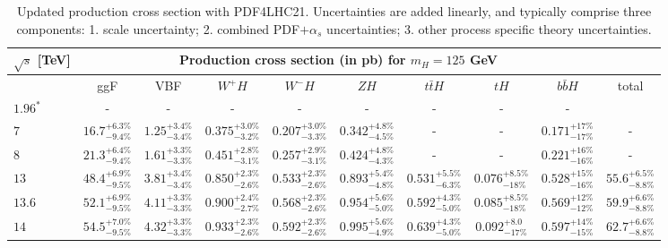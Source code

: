 \documentclass[11pt]{article}
\begin{document}
\begin{table}[ht!]
\caption{Updated production cross section with PDF4LHC21. Uncertainties are added linearly, and typically comprise three components: 1. scale uncertainty; 2. combined PDF$+\alpha_s$ uncertainties; 3. other process specific theory uncertainties.}
\label{tab:PDF125GeV}
\begin{center}%
\begin{small}%
\begin{tabular}{lccccccccc}%
\toprule
$\sqrt{s}$ [TeV] & \multicolumn{8}{c}{Production cross section (in pb) for $m_H = 125$ GeV}
\\
\midrule
& ggF & VBF & $W^+H$& $W^-H$ & $ZH$ & $t\bar{t}H$ & $tH$ & $b\bar{b}H$ & total \\
\midrule
$1.96^*$ & - & - & - & - & - & - & - & - \\[0.2cm]
%
$7$ & $16.7^{+6.3\%}_{-9.4\%}$ & $1.25^{+3.4\%}_{-3.4\%}$   & $0.375^{+3.0\%}_{-3.2\%}$ & $0.207^{+3.0\%}_{-3.3\%}$ & $0.342^{+4.8\%}_{-4.5\%}$ & - & - & $0.171^{+17\%}_{-17\%}$ & -\\[0.2cm]
%                                                                                                                   
$8$ & $21.3^{+6.4\%}_{-9.4\%}$ & $1.61^{+3.3\%}_{-3.3\%}$   & $0.451^{+2.8\%}_{-3.1\%}$ & $0.257^{+2.9\%}_{-3.1\%}$ & $0.424^{+4.8\%}_{-4.3\%}$ & - & - & $0.221^{+16\%}_{-16\%}$ & -\\[0.2cm]
%                                                                                                                   
$13$ & $48.4^{+6.9\%}_{-9.5\%}$ & $3.81^{+3.4\%}_{-3.4\%}$  & $0.850^{+2.3\%}_{-2.6\%}$  & $0.533^{+2.3\%}_{-2.6\%}$  & $0.893^{+5.4\%}_{-4.8\%}$ & $0.531^{+5.5\%}_{-6.3\%}$ & $0.076^{+8.5\%}_{-18\%}$ & $0.528^{+15\%}_{-16\%}$ & $55.6^{+6.5\%}_{-8.8\%}$\\[0.2cm]
%                                                                                                                   
$13.6$ & $52.1^{+6.9\%}_{-9.5\%}$ & $4.11^{+3.3\%}_{-3.3\%}$& $0.900^{+2.4\%}_{-2.7\%}$  & $0.568^{+2.3\%}_{-2.6\%}$  & $0.954^{+5.6\%}_{-5.0\%}$ & $0.592^{+4.3\%}_{-5.0\%}$ & $0.085^{+8.5\%}_{-18\%}$ & $0.569^{+12\%}_{-12\%}$ & $59.9^{+6.6\%}_{-8.8\%}$ \\[0.2cm]
%                                                                                                                   
$14$ & $54.5^{+7.0\%}_{-9.5\%}$ & $4.32^{+3.3\%}_{-3.3\%}$  & $0.933^{+2.3\%}_{-2.6\%}$  & $0.592^{+2.3\%}_{-2.6\%}$  & $0.995^{+5.6\%}_{-4.9\%}$ & $0.639^{+4.3\%}_{-5.0\%}$ & $0.092^{+8.0}_{-17\%}$ & $0.597^{+14\%}_{-15\%}$ & $62.7^{+6.6\%}_{-8.8\%}$ \\
\bottomrule
\end{tabular}%
\end{small}%
\end{center}%
\end{table}

%
%
\end{document}
